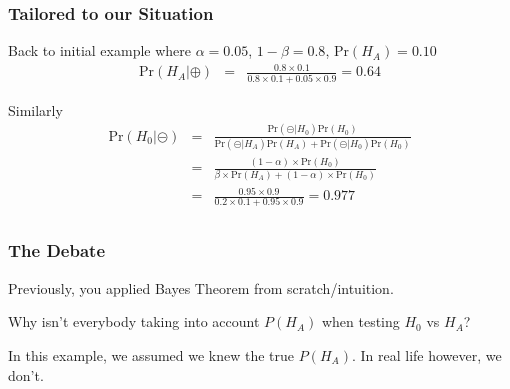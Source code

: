 \documentclass[handout]{beamer}
\newcommand{\blue}[1]{\textcolor{blue2}{#1}}
\newcommand{\prob}{\mbox{Pr}}
\newcommand{\cp}{\oplus}
\newcommand{\cm}{\circleddash}
\begin{document}
\begin{frame}[fragile]
\frametitle{Tailored to our Situation}

%
%
Back to initial example where $\alpha=0.05$, $1-\beta=0.8$, $\prob(H_A)=0.10$
\pause
\begin{eqnarray*}
\prob(H_A|\cp) &=& \frac{0.8 \times 0.1}{0.8 \times 0.1 + 0.05\times 0.9} = 0.64
\end{eqnarray*}

\pause Similarly
\begin{eqnarray*}
\prob(H_0|\cm) &=& \frac{\prob(\cm|H_0)\prob(H_0)}{\prob(\cm|H_A)\prob(H_A) + \prob(\cm|H_0)\prob(H_0)} \\
&=& \frac{(1-\alpha)\times\prob(H_0)}{
\beta\times\prob(H_A) + (1-\alpha)\times\prob(H_0)}\\
&=& \frac{0.95 \times 0.9}{0.2\times 0.1 + 0.95 \times 0.9} = 0.977\\
\end{eqnarray*}

\end{frame}



\begin{frame}[fragile]
\frametitle{The Debate}

Previously, you applied Bayes Theorem from scratch/intuition.
\pause
\vspace{0.5cm}

Why isn't everybody taking into account $P(H_A)$ when testing $H_0$ vs $H_A$?
\pause
\vspace{0.5cm}

In this example, we assumed we \blue{knew} the true $P(H_A)$.  In real life however, we don't.


\end{frame}
\end{document}
